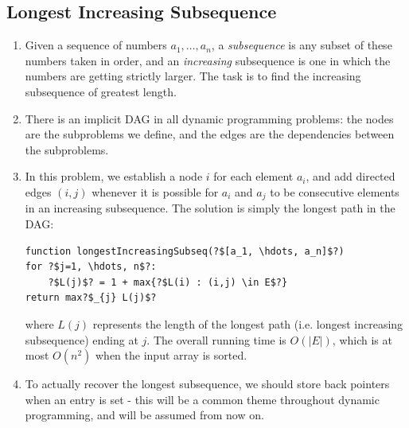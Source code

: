 \documentclass[10pt]{article}
\begin{document}
\begin{multicols}{2}
\begin{addmargin}[0.8em]{0.5em}
    \subsection{Longest Increasing Subsequence}
    \vspace{-0.2cm}
    \begin{enumerate}[label=(\alph*)]
        \item Given a sequence of numbers $a_1, \hdots, a_n$, a \textit{subsequence} is any subset of these numbers taken in order, and an \textit{increasing} subsequence is one in which the numbers are getting strictly larger. The task is to find the increasing subsequence of greatest length.
        \item There is an implicit DAG in all dynamic programming problems: the nodes are the subproblems we define, and the edges are the dependencies between the subproblems. 
        \item In this problem, we establish a node $i$ for each element $a_i$, and add directed edges $(i, j)$ whenever it is possible for $a_i$ and $a_j$ to be consecutive elements in an increasing subsequence. 
        The solution is simply the longest path in the DAG:
        \begin{verbatim}
function longestIncreasingSubseq(?$[a_1, \hdots, a_n]$?)
for ?$j=1, \hdots, n$?:
    ?$L(j)$? = 1 + max{?$L(i) : (i,j) \in E$?}
return max?$_{j} L(j)$?
        \end{verbatim}
        where $L(j)$ represents the length of the longest path (i.e. longest increasing subsequence) ending at $j$. The overall running time is $O(|E|)$, which is at most $O(n^2)$ when the input array is sorted.
        
        \item To actually recover the longest subsequence, we should store back pointers when an entry is set - this will be a common theme throughout dynamic programming, and will be assumed from now on.
    \end{enumerate}        
        

\end{addmargin}
\end{multicols}
\end{document}
